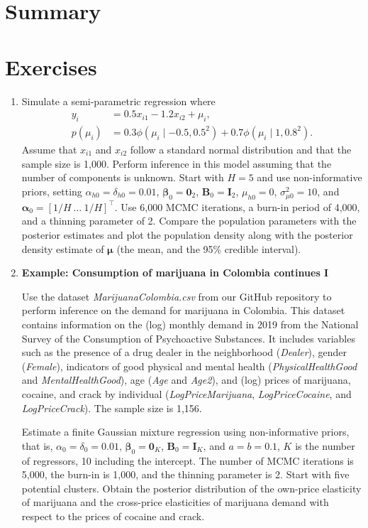 \section{Summary}\label{sec11_3}

\section{Exercises}\label{sec11_4}

\begin{enumerate}
	\item Simulate a semi-parametric regression where  
	\begin{align*}
		y_i &= 0.5x_{i1} - 1.2x_{i2} + \mu_i, \\
		p(\mu_i) &= 
		0.3 \phi(\mu_i \mid -0.5,0.5^2) + 0.7 \phi(\mu_i \mid 1,0.8^2).		
	\end{align*}
	Assume that $x_{i1}$ and $x_{i2}$ follow a standard normal distribution and that the sample size is 1,000. Perform inference in this model assuming that the number of components is unknown. Start with $H=5$ and use non-informative priors, setting $\alpha_{h0}=\delta_{h0}=0.01$, $\boldsymbol{\beta}_0=\boldsymbol{0}_2$, $\boldsymbol{B}_0=\boldsymbol{I}_2$, $\mu_{h0}=0$, $\sigma^2_{\mu 0}=10$, and $\boldsymbol{\alpha}_0=[1/H \ \dots \ 1/H]^{\top}$. Use 6,000 MCMC iterations, a burn-in period of 4,000, and a thinning parameter of 2. Compare the population parameters with the posterior estimates and plot the population density along with the posterior density estimate of $\boldsymbol{\mu}$ (the mean, and the 95\% credible interval).
	
	\item \textbf{Example: Consumption of marijuana in Colombia continues I}
	
	Use the dataset \textit{MarijuanaColombia.csv} from our GitHub repository to perform inference on the demand for marijuana in Colombia. This dataset contains information on the (log) monthly demand in 2019 from the National Survey of the Consumption of Psychoactive Substances. It includes variables such as the presence of a drug dealer in the neighborhood (\textit{Dealer}), gender (\textit{Female}), indicators of good physical and mental health (\textit{PhysicalHealthGood} and \textit{MentalHealthGood}), age (\textit{Age} and \textit{Age2}), and (log) prices of marijuana, cocaine, and crack by individual (\textit{LogPriceMarijuana}, \textit{LogPriceCocaine}, and \textit{LogPriceCrack}). The sample size is 1,156.
	
	Estimate a finite Gaussian mixture regression using non-informative priors, that is, $\alpha_{0}=\delta_{0}=0.01$, $\boldsymbol{\beta}_{0}=\boldsymbol{0}_K$, $\boldsymbol{B}_{0}=\boldsymbol{I}_K$, and $a=b=0.1$, $K$ is the number of regressors, 10 including the intercept. The number of MCMC iterations is 5,000, the burn-in is 1,000, and the thinning parameter is 2. Start with five potential clusters. Obtain the posterior distribution of the own-price elasticity of marijuana and the cross-price elasticities of marijuana demand with respect to the prices of cocaine and crack.
	

\end{enumerate}
